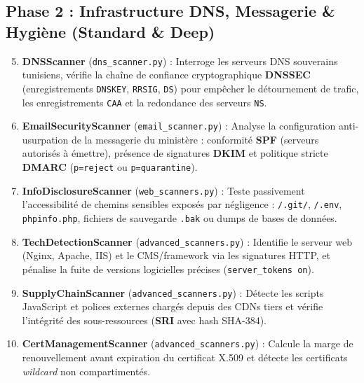 \subsection{Phase 2 : Infrastructure DNS, Messagerie \& Hygiène (Standard \& Deep)}
\begin{enumerate}
    \setcounter{enumi}{4}
    \item \textbf{DNSScanner} (\texttt{dns\_scanner.py}) : Interroge les serveurs DNS souverains tunisiens, vérifie la chaîne de confiance cryptographique \textbf{DNSSEC} (enregistrements \texttt{DNSKEY}, \texttt{RRSIG}, \texttt{DS}) pour empêcher le détournement de trafic, les enregistrements \texttt{CAA} et la redondance des serveurs \texttt{NS}.
    \item \textbf{EmailSecurityScanner} (\texttt{email\_scanner.py}) : Analyse la configuration anti-usurpation de la messagerie du ministère : conformité \textbf{SPF} (serveurs autorisés à émettre), présence de signatures \textbf{DKIM} et politique stricte \textbf{DMARC} (\texttt{p=reject} ou \texttt{p=quarantine}).
    \item \textbf{InfoDisclosureScanner} (\texttt{web\_scanners.py}) : Teste passivement l'accessibilité de chemins sensibles exposés par négligence : \texttt{/.git/}, \texttt{/.env}, \texttt{phpinfo.php}, fichiers de sauvegarde \texttt{.bak} ou dumps de bases de données.
    \item \textbf{TechDetectionScanner} (\texttt{advanced\_scanners.py}) : Identifie le serveur web (Nginx, Apache, IIS) et le CMS/framework via les signatures HTTP, et pénalise la fuite de versions logicielles précises (\texttt{server\_tokens on}).
    \item \textbf{SupplyChainScanner} (\texttt{advanced\_scanners.py}) : Détecte les scripts JavaScript et polices externes chargés depuis des CDNs tiers et vérifie l'intégrité des sous-ressources (\textbf{SRI} avec hash SHA-384).
    \item \textbf{CertManagementScanner} (\texttt{advanced\_scanners.py}) : Calcule la marge de renouvellement avant expiration du certificat X.509 et détecte les certificats \textit{wildcard} non compartimentés.
\end{enumerate}

